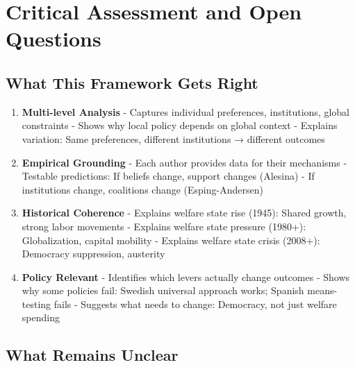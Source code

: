 \section{Critical Assessment and Open Questions}
\label{sec:critical}

\subsection{What This Framework Gets Right}

\begin{tcolorbox}[colback=blue!5!white, colframe=blue!75!black,
    title=Strengths of the Integrated Framework]

\begin{enumerate}

\item \textbf{Multi-level Analysis}
   - Captures individual preferences, institutions, global constraints
   - Shows why local policy depends on global context
   - Explains variation: Same preferences, different institutions → different outcomes

\item \textbf{Empirical Grounding}
   - Each author provides data for their mechanisms
   - Testable predictions: If beliefs change, support changes (Alesina)
   - If institutions change, coalitions change (Esping-Andersen)

\item \textbf{Historical Coherence}
   - Explains welfare state rise (1945): Shared growth, strong labor movements
   - Explains welfare state pressure (1980+): Globalization, capital mobility
   - Explains welfare state crisis (2008+): Democracy suppression, austerity

\item \textbf{Policy Relevant}
   - Identifies which levers actually change outcomes
   - Shows why some policies fail: Swedish universal approach works; Spanish means-testing fails
   - Suggests what needs to change: Democracy, not just welfare spending

\end{enumerate}

\end{tcolorbox}

\subsection{What Remains Unclear}

